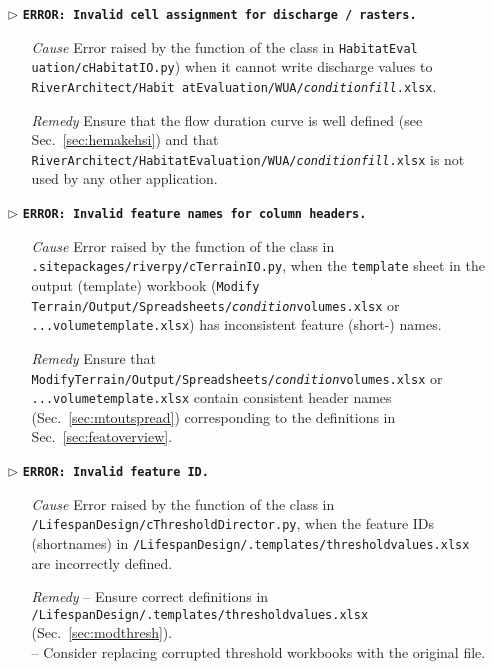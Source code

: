 \begin{itemize}
	\item[$\triangleright$]\textbf{\texttt{ERROR: Invalid cell assignment for discharge / rasters.}}
	\begin{itemize}
		\item[\textit{Cause}\hspace{0.27cm}] Error raised by the  function of the  class in \texttt{HabitatEval uation/cHabitatIO.py}) when it cannot write discharge values to \texttt{RiverArchitect/Habit atEvaluation/WUA/\textit{condition}{\myUnderscore}\textit{fill}.xlsx}.
		\item[\textit{Remedy}] Ensure that the flow duration curve is well defined (see Sec.~\ref{sec:hemakehsi}) and that \texttt{RiverArchitect/HabitatEvaluation/WUA/\textit{condition}{\myUnderscore}\textit{fill}.xlsx} is not used by any other application.\\
	\end{itemize}	
	
	\item[$\triangleright$]\textbf{\texttt{ERROR: Invalid feature names for column headers.}}
	\begin{itemize}
		\item[\textit{Cause}\hspace{0.27cm}] Error raised by the  function of the  class in \texttt{.site{\myUnderscore}packages/riverpy/cTerrainIO.py}, when the \texttt{template} sheet in the output (template) workbook (\texttt{Modify Terrain/Output/Spreadsheets/\textit{condition}{\myUnderscore}volumes.xlsx} or \texttt{...volume{\myUnderscore}template.xlsx}) has inconsistent feature (short-) names.
		\item[\textit{Remedy}] Ensure that \texttt{ModifyTerrain/Output/Spreadsheets/\textit{condition}{\myUnderscore}volumes.xlsx} or \\\texttt{...volume{\myUnderscore}template.xlsx} contain consistent header names (Sec.~\ref{sec:mtoutspread}) corresponding to the definitions in Sec.~\ref{sec:featoverview}.\\
	\end{itemize}
	
	\item[$\triangleright$]\textbf{\texttt{ERROR: Invalid feature ID.}}
	\begin{itemize}
		\item[\textit{Cause}\hspace{0.27cm}] Error raised by the  function of the  class in \texttt{/LifespanDesign/cThresholdDirector.py}, when the feature IDs (shortnames) in \texttt{/LifespanDesign/.templates/threshold{\myUnderscore}values.xlsx} are incorrectly defined.
		\item[\textit{Remedy}] -- Ensure correct definitions in \texttt{/LifespanDesign/.templates/threshold{\myUnderscore}values.xlsx} (Sec.~\ref{sec:modthresh}).\\
								-- Consider replacing corrupted threshold workbooks with the original file.\\
	\end{itemize}
	

\end{itemize}
